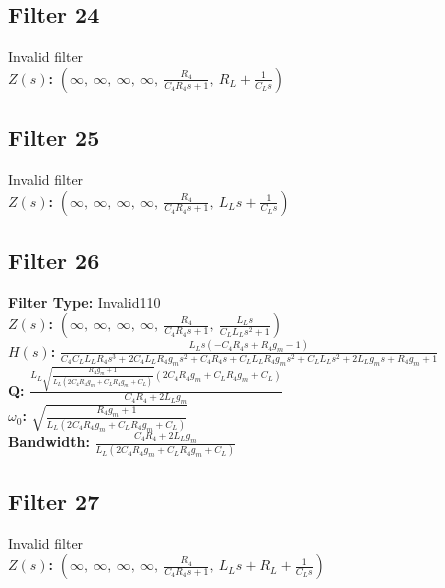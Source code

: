 \documentclass{article}
\begin{document}
\subsection*{Filter 24}
Invalid filter \\ 
\textbf{$Z(s)$:} $\left( \infty, \  \infty, \  \infty, \  \infty, \  \frac{R_{4}}{C_{4} R_{4} s + 1}, \  R_{L} + \frac{1}{C_{L} s}\right)$ \\ 
\subsection*{Filter 25}
Invalid filter \\ 
\textbf{$Z(s)$:} $\left( \infty, \  \infty, \  \infty, \  \infty, \  \frac{R_{4}}{C_{4} R_{4} s + 1}, \  L_{L} s + \frac{1}{C_{L} s}\right)$ \\ 
\subsection*{Filter 26}
\textbf{Filter Type:} Invalid110 \\ 
\textbf{$Z(s)$:} $\left( \infty, \  \infty, \  \infty, \  \infty, \  \frac{R_{4}}{C_{4} R_{4} s + 1}, \  \frac{L_{L} s}{C_{L} L_{L} s^{2} + 1}\right)$ \\ 
\textbf{$H(s)$:} $\frac{L_{L} s \left(- C_{4} R_{4} s + R_{4} g_{m} - 1\right)}{C_{4} C_{L} L_{L} R_{4} s^{3} + 2 C_{4} L_{L} R_{4} g_{m} s^{2} + C_{4} R_{4} s + C_{L} L_{L} R_{4} g_{m} s^{2} + C_{L} L_{L} s^{2} + 2 L_{L} g_{m} s + R_{4} g_{m} + 1}$ \\ 
\textbf{Q:} $\frac{L_{L} \sqrt{\frac{R_{4} g_{m} + 1}{L_{L} \left(2 C_{4} R_{4} g_{m} + C_{L} R_{4} g_{m} + C_{L}\right)}} \left(2 C_{4} R_{4} g_{m} + C_{L} R_{4} g_{m} + C_{L}\right)}{C_{4} R_{4} + 2 L_{L} g_{m}}$ \\ 
\textbf{$\omega_0$:} $\sqrt{\frac{R_{4} g_{m} + 1}{L_{L} \left(2 C_{4} R_{4} g_{m} + C_{L} R_{4} g_{m} + C_{L}\right)}}$ \\ 
\textbf{Bandwidth:} $\frac{C_{4} R_{4} + 2 L_{L} g_{m}}{L_{L} \left(2 C_{4} R_{4} g_{m} + C_{L} R_{4} g_{m} + C_{L}\right)}$ \\ 
\subsection*{Filter 27}
Invalid filter \\ 
\textbf{$Z(s)$:} $\left( \infty, \  \infty, \  \infty, \  \infty, \  \frac{R_{4}}{C_{4} R_{4} s + 1}, \  L_{L} s + R_{L} + \frac{1}{C_{L} s}\right)$ \\ 
\end{document}
